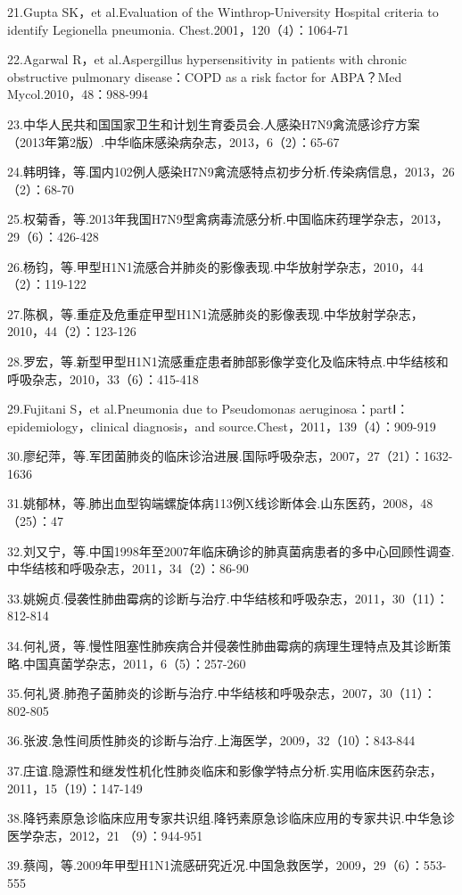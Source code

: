 21.Gupta SK，et al.Evaluation of the Winthrop-University Hospital
criteria to identify Legionella pneumonia. Chest.2001，120（4）：1064-71

22.Agarwal R，et al.Aspergillus hypersensitivity in patients with
chronic obstructive pulmonary disease：COPD as a risk factor for
ABPA？Med Mycol.2010，48：988-994

23.中华人民共和国国家卫生和计划生育委员会.人感染H7N9禽流感诊疗方案（2013年第2版）.中华临床感染病杂志，2013，6（2）：65-67

24.韩明锋，等.国内102例人感染H7N9禽流感特点初步分析.传染病信息，2013，26（2）：68-70

25.权菊香，等.2013年我国H7N9型禽病毒流感分析.中国临床药理学杂志，2013，29（6）：426-428

26.杨钧，等.甲型H1N1流感合并肺炎的影像表现.中华放射学杂志，2010，44（2）：119-122

27.陈枫，等.重症及危重症甲型H1N1流感肺炎的影像表现.中华放射学杂志，2010，44（2）：123-126

28.罗宏，等.新型甲型H1N1流感重症患者肺部影像学变化及临床特点.中华结核和呼吸杂志，2010，33（6）：415-418

29.Fujitani S，et al.Pneumonia due to Pseudomonas
aeruginosa：partⅠ：epidemiology，clinical diagnosis，and
source.Chest，2011，139（4）：909-919

30.廖纪萍，等.军团菌肺炎的临床诊治进展.国际呼吸杂志，2007，27（21）：1632-1636

31.姚郁林，等.肺出血型钩端螺旋体病113例X线诊断体会.山东医药，2008，48（25）：47

32.刘又宁，等.中国1998年至2007年临床确诊的肺真菌病患者的多中心回顾性调查.中华结核和呼吸杂志，2011，34（2）：86-90

33.姚婉贞.侵袭性肺曲霉病的诊断与治疗.中华结核和呼吸杂志，2011，30（11）：812-814

34.何礼贤，等.慢性阻塞性肺疾病合并侵袭性肺曲霉病的病理生理特点及其诊断策略.中国真菌学杂志，2011，6（5）：257-260

35.何礼贤.肺孢子菌肺炎的诊断与治疗.中华结核和呼吸杂志，2007，30（11）：802-805

36.张波.急性间质性肺炎的诊断与治疗.上海医学，2009，32（10）：843-844

37.庄谊.隐源性和继发性机化性肺炎临床和影像学特点分析.实用临床医药杂志，2011，15（19）：147-149

38.降钙素原急诊临床应用专家共识组.降钙素原急诊临床应用的专家共识.中华急诊医学杂志，2012，21
（9）：944-951

39.蔡闯，等.2009年甲型H1N1流感研究近况.中国急救医学，2009，29（6）：553-555

